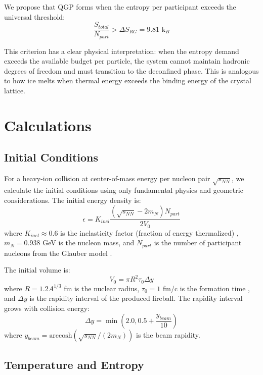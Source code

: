 \documentclass[12pt,a4paper]{article}
\begin{document}
We propose that QGP forms when the entropy per participant exceeds the universal threshold:
\begin{equation}
\frac{S_{total}}{N_{part}} > \Delta S_{RG} = 9.81 \text{ k}_B
\label{eq:qgp_criterion}
\end{equation}

This criterion has a clear physical interpretation: when the entropy demand exceeds the available budget per particle, the system cannot maintain hadronic degrees of freedom and must transition to the deconfined phase. This is analogous to how ice melts when thermal energy exceeds the binding energy of the crystal lattice.

\section{Calculations}

\subsection{Initial Conditions}

For a heavy-ion collision at center-of-mass energy per nucleon pair $\sqrt{s_{NN}}$, we calculate the initial conditions using only fundamental physics and geometric considerations. The initial energy density is:
\begin{equation}
\epsilon = K_{inel} \frac{(\sqrt{s_{NN}} - 2m_N) N_{part}}{2V_0}
\label{eq:energy_density}
\end{equation}
where $K_{inel} \approx 0.6$ is the inelasticity factor (fraction of energy thermalized) \cite{Bjorken1983}, $m_N = 0.938$ GeV is the nucleon mass, and $N_{part}$ is the number of participant nucleons from the Glauber model \cite{Miller2007}.

The initial volume is:
\begin{equation}
V_0 = \pi R^2 \tau_0 \Delta y
\label{eq:volume}
\end{equation}
where $R = 1.2 A^{1/3}$ fm is the nuclear radius, $\tau_0 = 1$ fm/c is the formation time \cite{Bjorken1983}, and $\Delta y$ is the rapidity interval of the produced fireball. The rapidity interval grows with collision energy:
\begin{equation}
\Delta y = \min\left(2.0, 0.5 + \frac{y_{beam}}{10}\right)
\label{eq:rapidity}
\end{equation}
where $y_{beam} = \text{arccosh}(\sqrt{s_{NN}}/(2m_N))$ is the beam rapidity.

\subsection{Temperature and Entropy}
\end{document}
